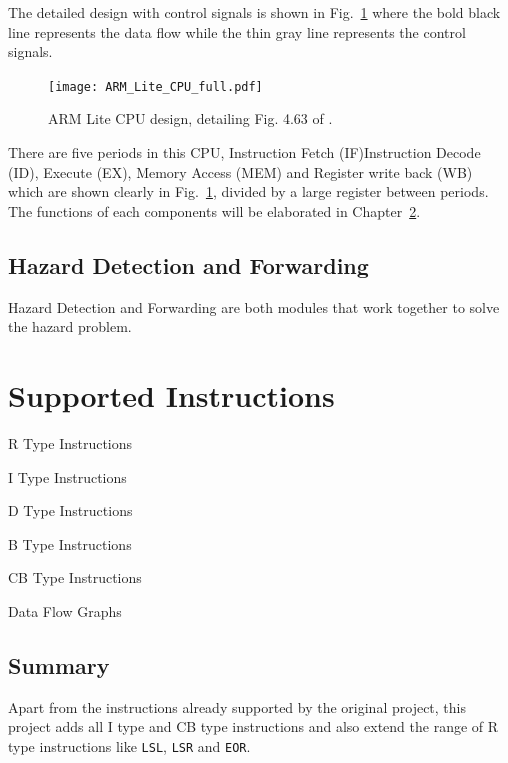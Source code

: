 \documentclass[11pt,fancy,bibstyle=ieee]{elegantbook}
\begin{document}
    The detailed design with control signals is shown in Fig.~\ref{fig:CPU_p1} where the bold black line represents the data flow while the thin gray line represents the control signals.

    \begin{figure}[htbp]
      \centering
      \texttt{[image: ARM\_Lite\_CPU\_full.pdf]}
      \caption{ARM Lite CPU design, detailing Fig. 4.63 of \cite{patterson2016computer}.}
      \label{fig:CPU_p1}
    \end{figure}

    There are five periods in this CPU, Instruction Fetch (IF)Instruction Decode (ID), Execute (EX), Memory Access (MEM) and Register write back (WB) which are shown clearly in Fig.~\ref{fig:CPU_p1}, divided by a large register between periods.
    The functions of each components will be elaborated in Chapter~\ref{cha:instructions}.

  \section{Hazard Detection and Forwarding}

    Hazard Detection and Forwarding are both modules that work together to solve the hazard problem.


\chapter{Supported Instructions}\label{cha:instructions}

  \begin{introduction}
    \item R Type Instructions
    \item I Type Instructions
    \item D Type Instructions
    \item B Type Instructions
    \item CB Type Instructions
    \item Data Flow Graphs
  \end{introduction}

  \section{Summary}

    Apart from the instructions already supported by the original project,
    this project adds all I type and CB type instructions and also extend the range of R type instructions like \texttt{LSL}, \texttt{LSR} and \texttt{EOR}.
\end{document}
